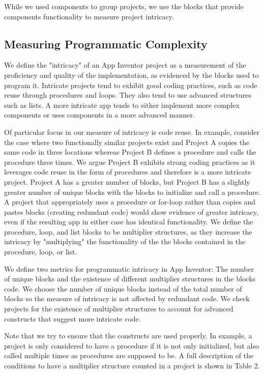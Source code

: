 \documentclass[conference]{IEEEtran}
\begin{document}
While we used components to group projects, we use the blocks that provide components functionality to measure project intricacy.

\subsection{Measuring Programmatic Complexity}

We define the "intricacy" of an App Inventor project as a measurement of the proficiency and quality of the implementation, as evidenced by the blocks used to program it. Intricate projects tend to exhibit good coding practices, such as code reuse through procedures and loops. They also tend to use advanced structures such as lists. A more intricate app tends to either implement more complex components or uses components in a more advanced manner. 

Of particular focus in our measure of intricacy is code reuse. In example, consider the case where two functionally similar projects exist and Project A copies the same code in three locations whereas Project B defines a procedure and calls the procedure three times. We argue Project B exhibits strong coding practices as it leverages code reuse in the form of procedures and therefore is a more intricate project. Project A has a greater number of blocks, but Project B has a slightly greater number of unique blocks with the blocks to initialize and call a procedure. A project that appropriately uses a procedure or for-loop rather than copies and pastes blocks (creating redundant code) would show evidence of greater intricacy, even if the resulting app in either case has identical functionality. We define the procedure, loop, and list blocks to be multiplier structures, as they increase the intricacy by "multiplying" the functionality of the the blocks contained in the procedure, loop, or list.

We define two metrics for programmatic intricacy in App Inventor: The number of unique blocks and the existence of different multiplier structures in the blocks code. We choose the number of unique blocks instead of the total number of blocks so the measure of intricacy is not affected by redundant code. We check projects for the existence of multiplier structures to account for advanced constructs that suggest more intricate code. 

Note that we try to ensure that the constructs are used properly. In example, a project is only considered to have a procedure if it is not only initialized, but also called multiple times as procedures are supposed to be. A full description of the conditions to have a multiplier structure counted in a project is shown in Table 2.
\end{document}
